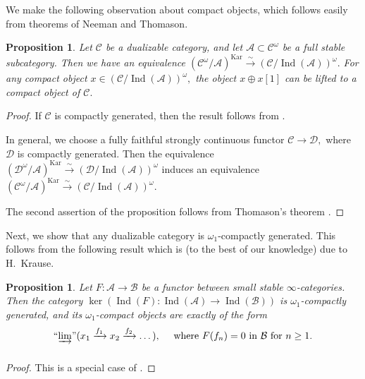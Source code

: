 \documentclass[11pt,leqno]{amsart}
\newtheorem{prop}[theo]{Proposition}
\numberwithin{equation}{section}
\newcommand{\indlim}[1][]{\mathop{\varinjlim}\limits_{#1}}
\newcommand{\inddlim}[1][]{{``{\indlim[#1]}"}}
\newcommand{\xto}{\xrightarrow}
\newcommand{\cD}{{\mathcal D}}
\newcommand{\cA}{{\mathcal A}}
\newcommand{\cB}{{\mathcal B}}
\newcommand{\cC}{{\mathcal C}}
\newcommand{\Kar}{\operatorname{Kar}}
\newcommand{\Ind}{\operatorname{Ind}}
\begin{document}
We make the following observation about compact objects, which follows easily from theorems of Neeman and Thomason.

\begin{prop}\label{prop:compact_objects_in_quotients} Let $\cC$ be a dualizable category, and let $\cA\subset \cC^{\omega}$ be a full stable subcategory. Then we have an equivalence $(\cC^{\omega}/\cA)^{\Kar}\xto{\sim}(\cC/\Ind(\cA))^{\omega}.$ For any compact object $x\in (\cC/\Ind(\cA))^{\omega},$ the object $x\oplus x[1]$ can be lifted to a compact object of $\cC.$\end{prop}

\begin{proof}If $\cC$ is compactly generated, then the result follows from \cite[Theorem 2.1]{Nee96}. 

In general, we choose a fully faithful strongly continuous functor $\cC\to\cD,$ where $\cD$ is compactly generated. Then the equivalence $(\cD^{\omega}/\cA)^{\Kar}\xto{\sim}(\cD/\Ind(\cA))^{\omega}$ induces an equivalence $(\cC^{\omega}/\cA)^{\Kar}\xto{\sim}(\cC/\Ind(\cA))^{\omega}.$ 

The second assertion of the proposition follows from Thomason's theorem \cite[Theorem 2.1]{Th}.\end{proof}

Next, we show that any dualizable category is $\omega_1$-compactly generated. This follows from the following result which is (to the best of our knowledge) due to H.~Krause.

\begin{prop}\label{prop:generating_the_kernel}Let $F:\cA\to \cB$ be a functor between small stable $\infty$-categories. Then the category $\ker(\Ind(F):\Ind(\cA)\to \Ind(\cB))$ is $\omega_1$-compactly generated, and its $\omega_1$-compact objects are exactly of the form
\begin{equation}\label{eq:objects_of_ker}\inddlim(x_1\xto{f_1} x_2\xto{f_2}\dots),\quad \text{ where }F(f_n)=0\text{ in }\cB\text{ for }n\geq 1.\end{equation}
\end{prop}

\begin{proof}This is a special case of \cite[Theorem 7.4.1]{Kr}.\end{proof}
\end{document}
